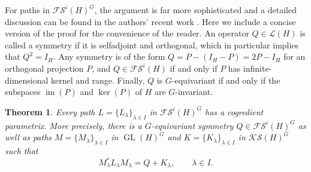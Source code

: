 \documentclass[pdftex]{sigma}
\numberwithin{equation}{section}
\newtheorem{Theorem}{Theorem}[section]
\theoremstyle{definition}
\DeclareMathOperator{\im}{im}
\DeclareMathOperator{\GL}{GL}
\begin{document}
For paths in $\mathcal{FS}^i(H)^G$, the argument is far more sophisticated and a detailed discussion can be found in the authors' recent work \cite{MJN25}. Here we include a concise version of the proof for the convenience of the reader. An operator $Q\in\mathcal{L}(H)$ is called a symmetry if it is selfadjoint and orthogonal, which in particular implies that $Q^2=I_H$. Any symmetry is of the form $Q=P-(I_H-P)=2P-I_H$ for an orthogonal projection $P$, and $Q\in\mathcal{FS}^i(H)$ if and only if $P$ has infinite-dimensional kernel and range. Finally, $Q$ is $G$-equivariant if and only if the subspaces $\im(P)$ and $\ker(P)$ of $H$ are $G$-invariant.

\begin{Theorem}\label{thm-cogredpar}
Every path $L=\{L_\lambda\}_{\lambda\in I}$ in $\mathcal{FS}^i(H)^G$ has a cogredient parametrix. More precisely, there is a $G$-equivariant symmetry $Q\in\mathcal{FS}^i(H)^G$ as well as paths $M=\{M_\lambda\}_{\lambda\in I}$ in $\GL(H)^G$ and $K=\{K_\lambda\}_{\lambda\in I}$ in $\mathcal{KS}(H)^G$ such that
\[M^\ast_\lambda L_\lambda M_\lambda=Q+K_\lambda,\qquad\lambda\in I.\]
\end{Theorem}
\end{document}
